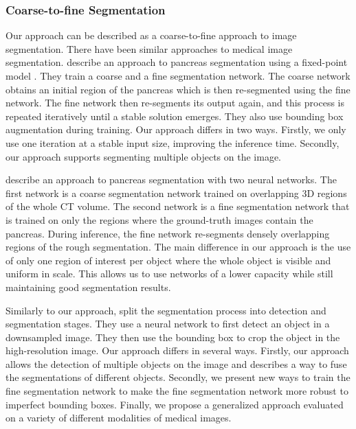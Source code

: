 \subsubsection{Coarse-to-fine Segmentation}

Our approach can be described as a coarse-to-fine approach to image segmentation. There have been similar approaches to medical image segmentation. \citet{zhouFixedPointModelPancreas2017} describe an approach to pancreas segmentation using a fixed-point model \cite{pmlr-v28-li13b}. They train a coarse and a fine segmentation network. The coarse network obtains an initial region of the pancreas which is then re-segmented using the fine network. The fine network then re-segments its output again, and this process is repeated iteratively until a stable solution emerges. They also use bounding box augmentation during training. Our approach differs in two ways. Firstly, we only use one iteration at a stable input size, improving the inference time. Secondly, our approach supports segmenting multiple objects on the image.

\citet{zhu3DCoarsetoFineFramework2018} describe an approach to pancreas segmentation with two neural networks. The first network is a coarse segmentation network trained on overlapping 3D regions of the whole CT volume. The second network is a fine segmentation network that is trained on only the regions where the ground-truth images contain the pancreas. During inference, the fine network re-segments densely overlapping regions of the rough segmentation. The main difference in our approach is the use of only one region of interest per object where the whole object is visible and uniform in scale. This allows us to use networks of a lower capacity while still maintaining good segmentation results.

Similarly to our approach, \citet{jhaInstanceSegmentationWhole2021} split the segmentation process into detection and segmentation stages. They use a neural network to first detect an object in a downsampled image. They then use the bounding box to crop the object in the high-resolution image. Our approach differs in several ways. Firstly, our approach allows the detection of multiple objects on the image and describes a way to fuse the segmentations of different objects. Secondly, we present new ways to train the fine segmentation network to make the fine segmentation network more robust to imperfect bounding boxes. Finally, we propose a generalized approach evaluated on a variety of different modalities of medical images.

